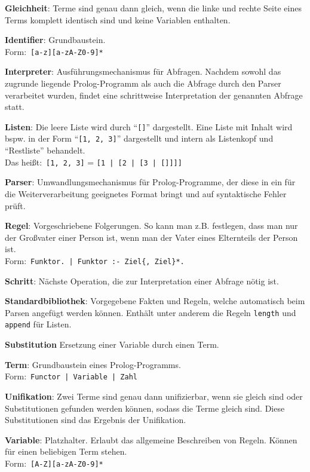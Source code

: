 \documentclass[parskip=full,11pt,twoside]{scrartcl}
\begin{document}
\textbf{Gleichheit}:
Terme sind genau dann gleich, wenn die linke und rechte Seite eines Terms komplett identisch sind und keine Variablen enthalten.

\textbf{Identifier}:
Grundbaustein.\\Form:\ \texttt{[a-z][a-zA-Z0-9]*}

\textbf{Interpreter}:
Ausführungsmechanismus für Abfragen. Nachdem sowohl das zugrunde liegende Prolog-Programm als auch die Abfrage durch den Parser verarbeitet wurden, findet eine schrittweise Interpretation der genannten Abfrage statt.

\textbf{Listen}:
Die leere Liste wird durch \enquote{\texttt{[]}} dargestellt. Eine Liste mit Inhalt wird bspw. in der Form \enquote{\texttt{[1, 2, 3]}} dargestellt und intern als Listenkopf und \enquote{Restliste} behandelt.\\Das heißt:\ \texttt{[1, 2, 3]} = \texttt{[1 | [2 | [3 | []]]]}

\textbf{Parser}:
Umwandlungsmechanismus für Prolog-Programme, der diese in ein für die Weiterverarbeitung geeignetes Format bringt und auf syntaktische Fehler prüft.

\textbf{Regel}:
Vorgeschriebene Folgerungen. So kann man z.B. festlegen, dass man nur der Großvater einer Person ist, wenn man der Vater eines Elternteils der Person ist.\\Form:\ \texttt{Funktor. | Funktor :- Ziel\{, Ziel\}*.}

\textbf{Schritt}:
Nächste Operation, die zur Interpretation einer Abfrage nötig ist.

\textbf{Standardbibliothek}:
Vorgegebene Fakten und Regeln, welche automatisch beim Parsen angefügt werden können. Enthält unter anderem die Regeln \texttt{length} und \texttt{append} für Listen.

\textbf{Substitution}
Ersetzung einer Variable durch einen Term.

\textbf{Term}:
Grundbaustein eines Prolog-Programms.\\Form:\  \texttt{Functor | Variable | Zahl}

\textbf{Unifikation}:
Zwei Terme sind genau dann unifizierbar, wenn sie gleich sind oder Substitutionen gefunden werden können, sodass die Terme gleich sind. Diese Substitutionen sind das Ergebnis der Unifikation.

\textbf{Variable}:
Platzhalter. Erlaubt das allgemeine Beschreiben von Regeln. Können für einen beliebigen Term stehen.\\Form:\  \texttt{[A-Z][a-zA-Z0-9]*}
\end{document}
